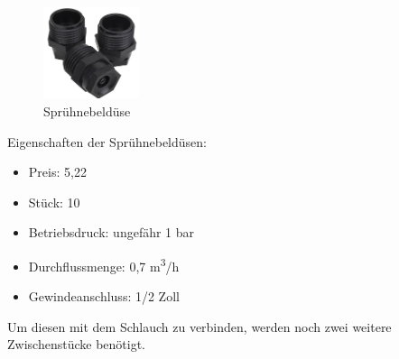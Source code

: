 \begin{figure}[!ht]
\begin{center}
	\caption{Sprühnebeldüse}
	\includegraphics[width=0.25\textwidth]{Spruehkopf}
\end{center}
\end{figure}

Eigenschaften der Sprühnebeldüsen:

\begin{itemize}
	\item{Preis: 5,22\textsf{\texteuro}}
	\item{Stück: 10}
	\item{Betriebsdruck: ungefähr 1 bar}
	\item{Durchflussmenge: 0,7 m\textsuperscript{3}/h}
	\item{Gewindeanschluss: 1/2 Zoll}
\end{itemize}

Um diesen mit dem Schlauch zu verbinden, werden noch zwei weitere Zwischenstücke benötigt.

